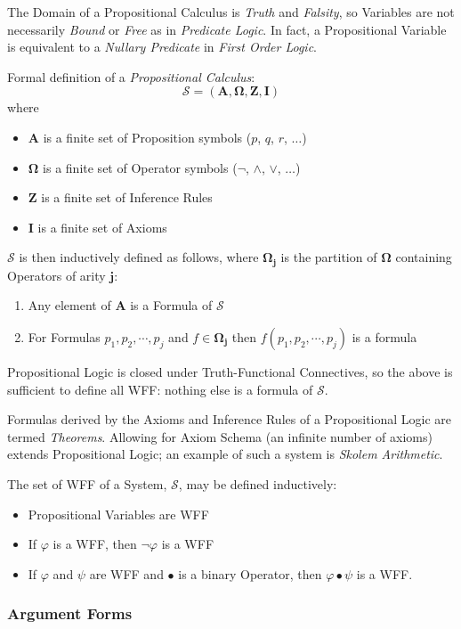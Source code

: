 \documentclass{article}
\begin{document}
The Domain of a Propositional Calculus is \emph{Truth} and
\emph{Falsity}, so Variables are not necessarily \emph{Bound} or
\emph{Free} as in \emph{Predicate Logic}. In fact, a Propositional
Variable is equivalent to a \emph{Nullary Predicate} in \emph{First
  Order Logic}.

Formal definition of a \emph{Propositional Calculus}:
\[
    \mathcal{S} = (\mathbf{A},\mathbf{\Omega},\mathbf{Z},\mathbf{I})
\]
where
\begin{itemize}
\item $\mathbf{A}$ is a finite set of Proposition symbols ($p$, $q$,
  $r$, $\ldots$)
\item $\mathbf{\Omega}$ is a finite set of Operator symbols ($\neg$,
  $\wedge$, $\vee$, $\ldots$)
\item $\mathbf{Z}$ is a finite set of Inference Rules
\item $\mathbf{I}$ is a finite set of Axioms
\end{itemize}
$\mathcal{S}$ is then inductively defined as follows, where
$\mathbf{\Omega_j}$ is the partition of $\mathbf{\Omega}$ containing
Operators of arity $\mathbf{j}$:
\begin{enumerate}
\item Any element of $\mathbf{A}$ is a Formula of $\mathcal{S}$
\item For Formulas $p_1, p_2, \cdots, p_j$ and $f \in
  \mathbf{\Omega_j}$ then $f(p_1, p_2, \cdots, p_j)$ is a formula
\end{enumerate}
Propositional Logic is closed under Truth-Functional Connectives, so
the above is sufficient to define all WFF: nothing else is a formula
of $\mathcal{S}$.

Formulas derived by the Axioms and Inference Rules of a Propositional
Logic are termed \emph{Theorems}. Allowing for Axiom Schema (an
infinite number of axioms) extends Propositional Logic; an example of
such a system is \emph{Skolem Arithmetic}\cite{skolem23}.

The set of WFF of a System, $\mathcal{S}$, may be defined inductively:
\begin{itemize}
\item Propositional Variables are WFF
\item If $\varphi$ is a WFF, then $\neg\varphi$ is a WFF
\item If $\varphi$ and $\psi$ are WFF and $\bullet$ is a binary Operator,
  then $\varphi \bullet \psi$ is a WFF.
\end{itemize}

\subsubsection{Argument Forms}
\end{document}

